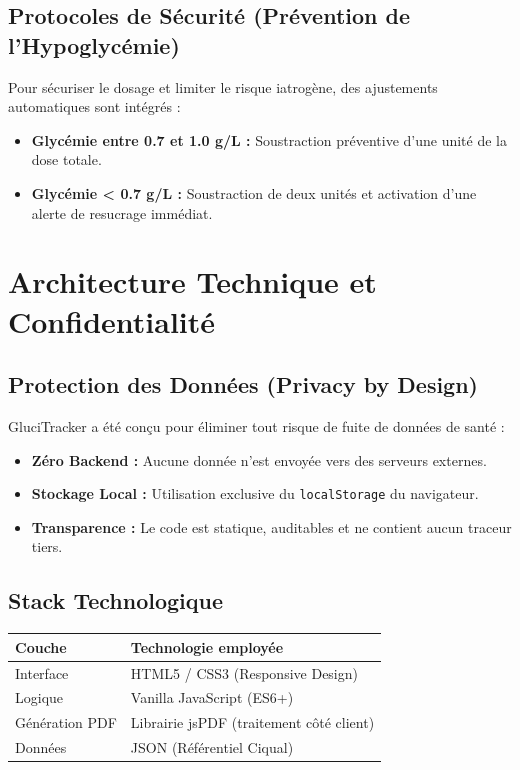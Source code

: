 \documentclass[11pt, a4paper]{report}
\begin{document}
\subsection{Protocoles de Sécurité (Prévention de l'Hypoglycémie)}
Pour sécuriser le dosage et limiter le risque iatrogène, des ajustements automatiques sont intégrés :
\begin{itemize}
    \item \textbf{Glycémie entre 0.7 et 1.0 g/L :} Soustraction préventive d'une unité de la dose totale.
    \item \textbf{Glycémie < 0.7 g/L :} Soustraction de deux unités et activation d'une alerte de resucrage immédiat.
\end{itemize}

\newpage

\section{Architecture Technique et Confidentialité}

\subsection{Protection des Données (Privacy by Design)}
GluciTracker a été conçu pour éliminer tout risque de fuite de données de santé :
\begin{itemize}
    \item \textbf{Zéro Backend :} Aucune donnée n'est envoyée vers des serveurs externes.
    \item \textbf{Stockage Local :} Utilisation exclusive du \texttt{localStorage} du navigateur.
    \item \textbf{Transparence :} Le code est statique, auditables et ne contient aucun traceur tiers.
\end{itemize}

\subsection{Stack Technologique}
\begin{table}[h]
\centering
\begin{tabular}{@{}ll@{}}
\toprule
\textbf{Couche} & \textbf{Technologie employée} \\ \midrule
Interface & HTML5 / CSS3 (Responsive Design) \\
Logique & Vanilla JavaScript (ES6+) \\
Génération PDF & Librairie jsPDF (traitement côté client) \\
Données & JSON (Référentiel Ciqual) \\ \bottomrule
\end{tabular}
\end{table}
\end{document}
